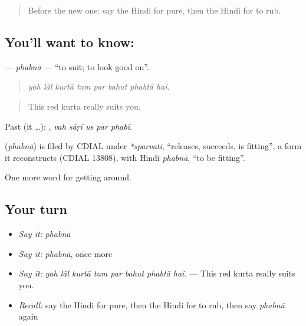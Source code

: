 \label{lesson:HI-C434-phabna}



\begin{quote}
Before the new one: say the Hindi for pure, then the Hindi for to rub.
\end{quote}

\subsection*{You'll want to know: }
\textbf{} — \emph{phabnā} — \textquotedblleft{}to suit; to look good on\textquotedblright{}.

\begin{quote}
       
\end{quote}

\begin{quote}
\emph{yah lāl kurtā tum par bahut phabtā hai.}
\end{quote}

\begin{quote}
This red kurta really suits you.
\end{quote}

Past (it …):     , \emph{vah sāṛī us par phabī}.

\begin{cousinweb}
\textbf{} (\emph{phabnā}) is filed by CDIAL under \emph{*sparvati}, \textquotedblleft{}releases, succeeds, is fitting\textquotedblright{}, a form it reconstructs (CDIAL 13808), with Hindi \emph{phabnā}, \textquotedblleft{}to be fitting\textquotedblright{}.
\end{cousinweb}

\begin{grammarlens}[title={What you've built}]
One more word for getting around.
\end{grammarlens}

\subsection*{Your turn}
\begin{itemize}
\raggedright
  \item \emph{Say it:} \emph{phabnā}
  \item \emph{Say it:} \emph{phabnā}, once more
  \item \emph{Say it:} \emph{yah lāl kurtā tum par bahut phabtā hai.} — This red kurta really suits you.
  \item \emph{Recall:} say the Hindi for pure, then the Hindi for to rub, then say \emph{phabnā} again
\end{itemize}

